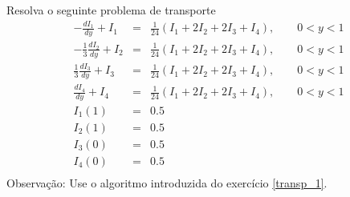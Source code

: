 \begin{exer}\label{transp_2}
 Resolva o seguinte problema de transporte
\begin{eqnarray*}
-\frac{dI_1}{dy}+I_1&=&\frac{1}{24}\left(I_1+2I_2+2I_3+I_4\right),\qquad 0<y<1\\
-\frac{1}{3}\frac{dI_2}{dy}+I_2&=&\frac{1}{24}\left(I_1+2I_2+2I_3+I_4\right),\qquad 0<y<1\\
\frac{1}{3}\frac{dI_3}{dy}+ I_3&=&\frac{1}{24}\left(I_1+2I_2+2I_3+I_4\right),\qquad 0<y<1\\
\frac{dI_4}{dy}+ I_4&=&\frac{1}{24}\left(I_1+2I_2+2I_3+I_4\right),\qquad 0<y<1\\
I_1(1)&=&0.5\\
I_2(1)&=&0.5\\
I_3(0)&=&0.5\\
I_4(0)&=&0.5\\
\end{eqnarray*}
Observação: Use o algoritmo introduzida do exercício \ref{transp_1}.
\end{exer}

